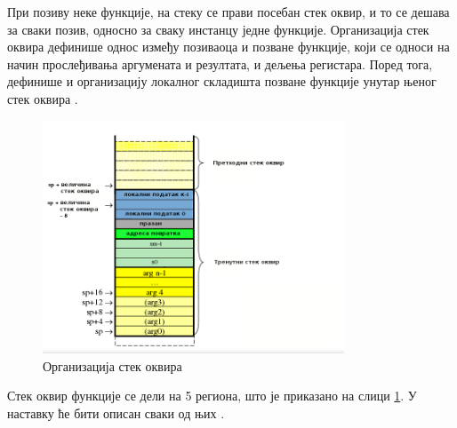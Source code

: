 \documentclass[12pt,oneside]{memoir}
\begin{document}
При позиву неке функције, на стеку се прави посебан стек оквир, и то се дешава за сваки позив, односно за сваку инстанцу једне функције. Организација стек оквира дефинише однос између позиваоца и позване функције, који се односи на начин прослеђивања аргумената и резултата, и дељења регистара. Поред тога, дефинише и организацију локалног складишта позване функције унутар њеног стек оквира \cite{konvencija}.

\begin{figure}[!ht]
  \centering
  \includegraphics[width=0.8\textwidth]{stack_frame.png}
  \caption{Организација стек оквира}
  \label{fig:stack_frame}
\end{figure}

Стек оквир функције се дели на 5 региона, што је приказано на слици \ref{fig:stack_frame}. У наставку ће бити описан сваки од њих \cite{konvencija}.
\end{document}

